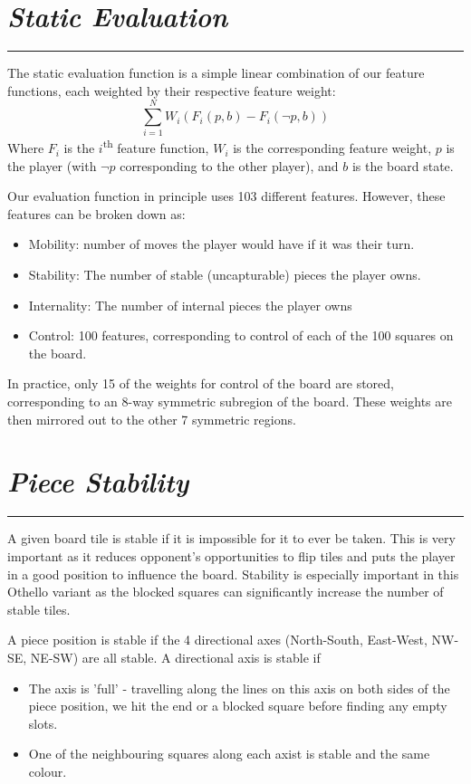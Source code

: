 \documentclass[10pt]{report}
\begin{document}
\begin{multicols}{2}
\section*{\emph{Static Evaluation}}
\hrule
The static evaluation function is a simple linear combination of our feature functions, each weighted by their respective feature weight:
\[
	\sum_{i=1}^N W_i \left(F_i(p,b) -F_i(\neg p,b) \right)
\]
Where $F_i$ is the $i$\textsuperscript{th} feature function, $W_i$ is the corresponding feature weight, $p$ is the player (with $\neg p$ corresponding to the other player), and $b$ is the board state.

Our evaluation function in principle uses 103 different features. However, these features can be broken down as:
    \begin{itemize}
  \item
    Mobility: number of moves the player would have if it was their turn.
  \item
   Stability:  The number of stable (uncapturable) pieces the player owns.
  \item
   Internality: The number of internal pieces the player owns
  \item
    Control: 100 features, corresponding to control of each of the 100 squares on the board.
  \end{itemize}

In practice, only 15 of the weights for control of the board are stored, corresponding to an 8-way symmetric subregion of the board. These weights are then mirrored out to the other 7 symmetric regions.

\section*{\emph{\textmd{Piece Stability}}}
\hrule

A given board tile is stable if it is impossible for it to ever be taken. This is very important as it reduces opponent's opportunities to flip tiles and puts the player in a good position to influence the board. Stability is especially important in this Othello variant as the blocked squares can significantly increase the number of stable tiles. 

A piece position is stable if the 4 directional axes (North-South, East-West, NW-SE, NE-SW) are all stable. A directional axis is stable if
    \begin{itemize}
\item The axis is 'full' - travelling along the lines on this axis on both sides of the piece position, we hit the end or a blocked square before finding any empty slots.
\item One of the neighbouring squares along each axist is stable and the same colour.
\end{itemize}


\end{multicols}
\end{document}
